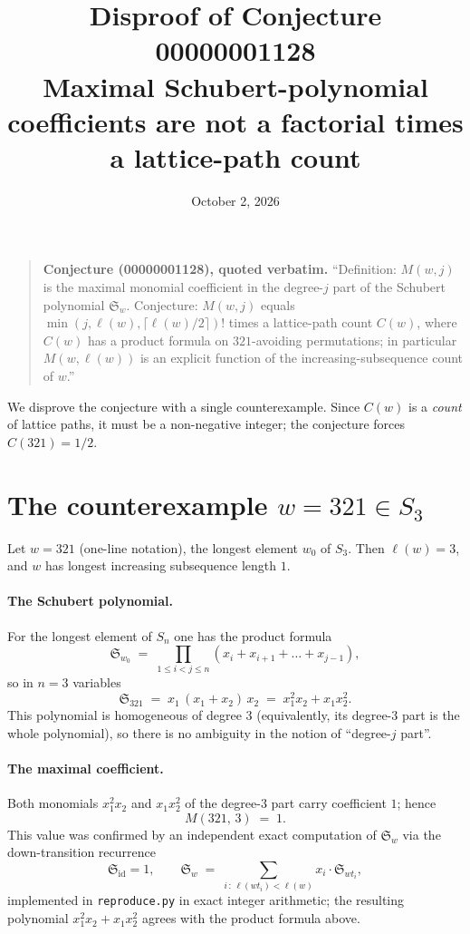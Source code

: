 \documentclass[11pt]{article}
\title{Disproof of Conjecture 00000001128\\
\large Maximal Schubert-polynomial coefficients are not a factorial times a lattice-path count}
\author{}
\date{October 2, 2026}
\newcommand{\Sch}{\mathfrak{S}}
\newcommand{\lcm}{\ell}
\begin{document}
\maketitle

\begin{quote}
\textbf{Conjecture (00000001128), quoted verbatim.} ``Definition: $M(w,j)$ is the maximal
monomial coefficient in the degree-$j$ part of the Schubert polynomial $\Sch_w$.
Conjecture: $M(w,j)$ equals $\min(j,\lcm(w),\lceil \lcm(w)/2\rceil)!$ times a lattice-path
count $C(w)$, where $C(w)$ has a product formula on $321$-avoiding permutations; in
particular $M(w,\lcm(w))$ is an explicit function of the increasing-subsequence count of $w$.''
\end{quote}

We disprove the conjecture with a single counterexample. Since $C(w)$ is a
\emph{count} of lattice paths, it must be a non-negative integer; the conjecture forces
$C(321) = 1/2$.

\section{The counterexample $w = 321 \in S_3$}

Let $w = 321$ (one-line notation), the longest element $w_0$ of $S_3$. Then
$\lcm(w) = 3$, and $w$ has longest increasing subsequence length $1$.

\paragraph{The Schubert polynomial.}
For the longest element of $S_n$ one has the product formula
\[
\Sch_{w_0} \;=\; \prod_{1 \le i < j \le n} (x_i + x_{i+1} + \dots + x_{j-1}),
\]
so in $n = 3$ variables
\[
\Sch_{321} \;=\; x_1\,(x_1 + x_2)\,x_2 \;=\; x_1^2 x_2 + x_1 x_2^2 .
\]
This polynomial is homogeneous of degree $3$ (equivalently, its degree-$3$ part is the
whole polynomial), so there is no ambiguity in the notion of ``degree-$j$ part''.

\paragraph{The maximal coefficient.}
Both monomials $x_1^2 x_2$ and $x_1 x_2^2$ of the degree-$3$ part carry coefficient $1$;
hence
\begin{equation}
M(321,\,3) \;=\; 1. \label{eq:M}
\end{equation}
This value was confirmed by an independent exact computation of $\Sch_w$ via the
down-transition recurrence
\[
\Sch_{\mathrm{id}} = 1, \qquad
\Sch_w \;=\; \sum_{i\,:\,\lcm(w t_i) < \lcm(w)} x_i \cdot \Sch_{w t_i},
\]
implemented in \texttt{reproduce.py} in exact integer arithmetic; the resulting
polynomial $x_1^2x_2 + x_1x_2^2$ agrees with the product formula above.
\end{document}
